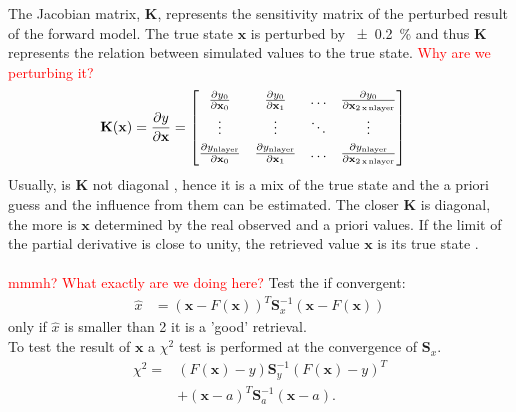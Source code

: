 The Jacobian matrix, $\mathbf{K}$, represents the sensitivity matrix of the perturbed result of the forward model. The true state $\mathbf{x}$ is perturbed by \SI{\pm 0.2}{\percent} and thus $\mathbf{K}$ represents the relation between simulated values to the true state.  \textcolor{red}{Why are we perturbing it?}
\begin{align}
	\mathbf{K}(\mathbf{x}) & = \frac{\partial y}{\partial \mathbf{x}} =
	\begin{bmatrix}
		\frac{\partial y_0}{\partial \mathbf{x}_0} & 
		\frac{\partial y_0}{\partial \mathbf{x}_1}  & 
		\ldots & 
		\frac{\partial y_0}{\partial \mathbf{x}_{2\,\text{x\,nlayer}}} \\[0.3em]
		\vdots & \vdots & \ddots & \vdots \\[0.3em]
		\frac{\partial y_{\text{nlayer}}}{\partial \mathbf{x}_0} &
		\frac{\partial y_{\text{nlayer}}}{\partial \mathbf{x}_1} &
		\ldots &
		\frac{\partial y_{\text{nlayer}}}{\partial \mathbf{x}_{2\,\text{x\,nlayer}}}
	\end{bmatrix} %
	\label{eq:Kmatrix}
\end{align}
Usually, is $\mathbf{K}$ not diagonal \citep{wood_estimation_2011}, hence it is a mix of the true state and the a priori guess and the influence from them can be estimated. 
The closer $\mathbf{K}$ is diagonal, the more is $\mathbf{x}$ determined by the real observed and a priori values. If the limit of the partial derivative is close to unity, the retrieved value $\mathbf{x}$ is its true state \citep{wood_estimation_2011}. \\
\\
\textcolor{red}{mmmh? What exactly are we doing here?}
Test the if convergent:
\begin{align}
	\hat{x} & = \left( \mathbf{x} - F(\mathbf{x}) \right)^T \mathbf{S}_x^{-1} \left(\mathbf{x} - F(\mathbf{x}) \right)
\end{align}
only if $\hat{x}$ is smaller than \num{2} it is a 'good' retrieval. 
\\
To test the result of $\mathbf{x}$ a $\chi^2$ test is performed at the convergence of $\mathbf{S}_x$.
%
\begin{equation}
\begin{split}
\chi^2 = & \left( F(\mathbf{x}) - y  \right) \mathbf{S}_y^{-1} \left( F(\mathbf{x}) - y \right)^T \\
& + \left( \mathbf{x} - a \right)^T \mathbf{S}_a^{-1} \left( \mathbf{x} - a\right). 
\end{split}
\label{eq:chi}
\end{equation}
